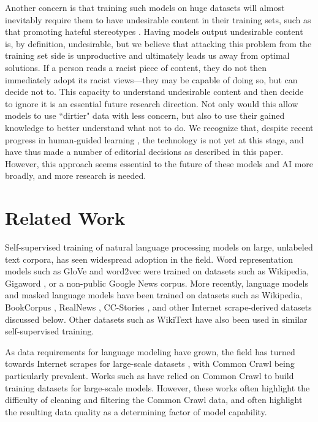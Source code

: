 \documentclass[11pt,a4paper]{article}
\begin{document}
Another concern is that training such models on huge datasets will almost inevitably require them to have undesirable content in their training sets, such as that promoting hateful stereotypes \citep{christian2020alignment}. Having models output undesirable content is, by definition, undesirable, but we believe that attacking this problem from the training set side is unproductive and ultimately leads us away from optimal solutions. 
If a person reads a racist piece of content, they do not then immediately adopt its racist views---they may be capable of doing so, but can decide not to.
This capacity to understand undesirable content and then decide to ignore it is an essential future research direction. Not only would this allow models to use ``dirtier" data with less concern, but also to use their gained knowledge to better understand what not to do. We recognize that, despite recent progress in human-guided learning \citep{learningsum}, the technology is not yet at this stage, and have thus made a number of editorial decisions as described in this paper. However, this approach seems essential to the future of these models and AI more broadly, and more research is needed.

\section{Related Work}

Self-supervised training of natural language processing models on large, unlabeled text corpora, has seen widespread adoption in the field. Word representation models such as GloVe \citep{pennington2014glove} and word2vec \citep{mikolov2013word2vec} were trained on datasets such as Wikipedia, Gigaword \citep{graff2003english}, or a non-public Google News corpus. More recently, language models \citep{GPT,GPT2,GPT3,TuringNLG,Megatron} and masked language models \citep{BERT,RoBERTa,T5} have been trained on datasets such as Wikipedia, BookCorpus \citep{BookCorpus}, RealNews \citep{zellers2019neuralfakenews}, CC-Stories \citep{trinh2018commonsense}, and other Internet scrape-derived datasets discussed below. Other datasets such as WikiText \citep{wikitext} have also been used in similar self-supervised training. 

As data requirements for language modeling have grown, the field has turned towards Internet scrapes for large-scale datasets \citep{OpenWeb}, with Common Crawl being particularly prevalent. Works such as \citet{GPT3,wenzek2019ccnet,OSCAR,T5} have relied on Common Crawl to build training datasets for large-scale models. However, these works often highlight the difficulty of cleaning and filtering the Common Crawl data, and often highlight the resulting data quality as a determining factor of model capability.
\end{document}
